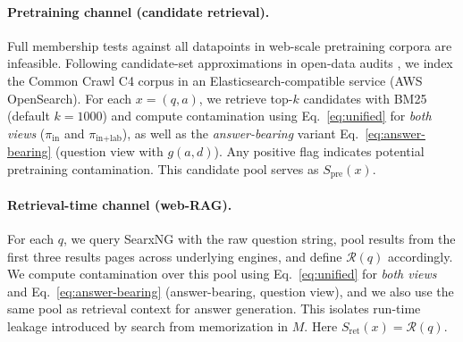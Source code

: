 \paragraph{Pretraining channel (candidate retrieval).}
Full membership tests against all datapoints in web-scale pretraining corpora are infeasible. Following candidate-set approximations in open-data audits \cite{liOpenSourceData2024}, we index the Common Crawl C4 corpus in an Elasticsearch-compatible service (AWS OpenSearch). For each $x=(q,a)$, we retrieve top-$k$ candidates with BM25 (default $k{=}1000$) and compute contamination using Eq.~\eqref{eq:unified} for \emph{both views} ($\pi_{\text{in}}$ and $\pi_{\text{in+lab}}$), as well as the \emph{answer-bearing} variant Eq.~\eqref{eq:answer-bearing} (question view with $g(a,d)$). Any positive flag indicates potential pretraining contamination. This candidate pool serves as $S_{\text{pre}}(x)$.

\paragraph{Retrieval-time channel (web-RAG).}
For each $q$, we query SearxNG \cite{SearxngSearxng2025} with the raw question string, pool results from the first three results pages across underlying engines, and define $\mathcal{R}(q)$ accordingly. We compute contamination over this pool using Eq.~\eqref{eq:unified} for \emph{both views} and Eq.~\eqref{eq:answer-bearing} (answer-bearing, question view), and we also use the same pool as retrieval context for answer generation. This isolates run-time leakage introduced by search from memorization in $M$. Here $S_{\text{ret}}(x)=\mathcal{R}(q)$.
